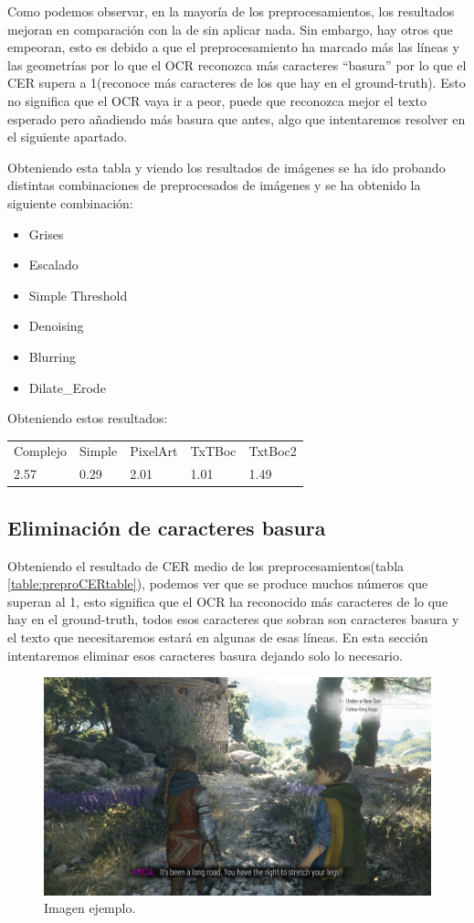 Como podemos observar, en la mayoría de los preprocesamientos, los resultados mejoran en comparación con la de sin aplicar nada. Sin embargo, hay otros que empeoran, esto es debido a que el preprocesamiento ha marcado más las líneas y las geometrías por lo que el OCR reconozca más caracteres ``basura'' por lo que el CER supera a 1(reconoce más caracteres de los que hay en el ground-truth). Esto no significa que el OCR vaya ir a peor, puede que reconozca mejor el texto esperado pero añadiendo más basura que antes, algo que intentaremos resolver en el siguiente apartado. 

Obteniendo esta tabla y viendo los resultados de imágenes se ha ido probando distintas combinaciones de preprocesados de imágenes y se ha obtenido la siguiente combinación:
\begin{itemize}
	\item Grises
	\item Escalado
	\item Simple Threshold
	\item Denoising
	\item Blurring
	\item Dilate\_Erode	
\end{itemize}
Obteniendo estos resultados:
\begin{table}[H]
	\begin{tabular}{lllll}
		Complejo & Simple & PixelArt & TxTBoc & TxtBoc2                      \\
		2.57     & 0.29   & 2.01     & 1.01   & 1.49
	\end{tabular}
\end{table}
\subsection{Eliminación de caracteres basura}
Obteniendo el resultado de CER medio de los preprocesamientos(tabla \ref{table:preproCERtable}), podemos ver que se produce muchos números que superan al 1, esto significa que el OCR ha reconocido más caracteres de lo que hay en el ground-truth, todos esos caracteres que sobran son caracteres basura y el texto que necesitaremos estará en algunas de esas líneas. En esta sección intentaremos eliminar esos caracteres basura dejando solo lo necesario.
	\begin{figure}[H]
	\centering
	\includegraphics[width = 1\textwidth]{Imagenes/Sample_Trash_Char.png}
	\caption{Imagen ejemplo.}
	\label{fig:Trash_Char}
\end{figure}

